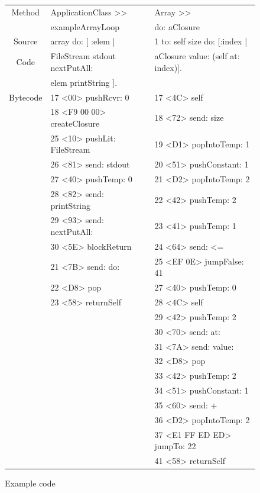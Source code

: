 \documentclass[a4paper,12pt,twoside]{../includes/ThesisStyle}
\begin{document}
\begin{figure}
	\small
    \begin{center}
		\noindent \begin{tabular}{@{}c|l|l@{}}
		Method & ApplicationClass >> & Array >> \\
		 & exampleArrayLoop & do: aClosure \\
		\midrule
		Source &  array do: [ :elem | & 1 to: self size do: [:index | \\
		Code &\hspace{0.3cm}FileStream stdout nextPutAll: &\hspace{0.3cm}aClosure value: (self at: index)]. \\
		 &\hspace{0.6cm}elem printString ]. &  \\
		\midrule
		Bytecode &  17 <00> pushRcvr: 0 & 17 <4C> self \\
		& 18 <F9 00 00> createClosure & 18 <72> send: size \\
		& 	        25 <10> pushLit: FileStream & 19 <D1> popIntoTemp: 1 \\
		& 	        26 <81> send: stdout & 20 <51> pushConstant: 1 \\
		& 	        27 <40> pushTemp: 0 & 21 <D2> popIntoTemp: 2 \\
		& 	        28 <82> send: printString & 22 <42> pushTemp: 2 \\
		& 	        29 <93> send: nextPutAll: & 23 <41> pushTemp: 1 \\
		& 	        30 <5E> blockReturn & 24 <64> send: <= \\
		& 	21 <7B> send: do: & 25 <EF 0E> jumpFalse: 41 \\
		& 	22 <D8> pop & 27 <40> pushTemp: 0 \\
		& 	23 <58> returnSelf &  28 <4C> self \\
		&  &	29 <42> pushTemp: 2 \\
		&  & 	30 <70> send: at: \\
		&  & 	31 <7A> send: value: \\
		&  & 	32 <D8> pop \\
		&  & 	33 <42> pushTemp: 2 \\
		&  & 	34 <51> pushConstant: 1 \\
		&  & 	35 <60> send: + \\
		&  & 	36 <D2> popIntoTemp: 2 \\
		&  & 	37 <E1 FF ED ED> jumpTo: 22 \\
		&  & 	41 <58> returnSelf \\
		\end{tabular}
	\caption{Example code}
    \label{fig:ExampleCode}
    \end{center}
\end{figure}
\end{document}
